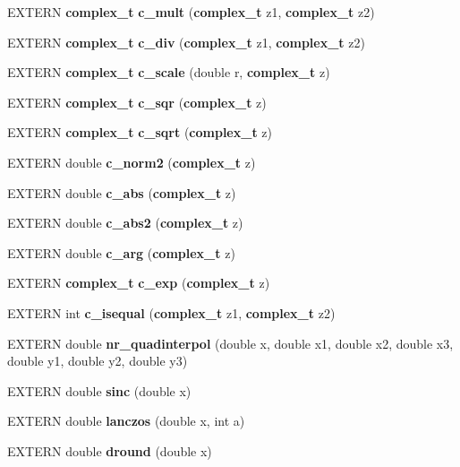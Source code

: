 \begin{CompactItemize}
\item 
EXTERN {\bf complex\_\-t} \textbf{c\_\-mult} ({\bf complex\_\-t} z1, {\bf complex\_\-t} z2)\label{group__nr_gbac492f503bff737e6a11c03e44e7ada}

\item 
EXTERN {\bf complex\_\-t} \textbf{c\_\-div} ({\bf complex\_\-t} z1, {\bf complex\_\-t} z2)\label{group__nr_g3cb3d7ddec167a30a5f7a159dea26c0f}

\item 
EXTERN {\bf complex\_\-t} \textbf{c\_\-scale} (double r, {\bf complex\_\-t} z)\label{group__nr_g4a8c814a8cb7b92c919b23e1ea64d615}

\item 
EXTERN {\bf complex\_\-t} \textbf{c\_\-sqr} ({\bf complex\_\-t} z)\label{group__nr_g72516630e1d745f5d1630b4c525cb5f8}

\item 
EXTERN {\bf complex\_\-t} \textbf{c\_\-sqrt} ({\bf complex\_\-t} z)\label{group__nr_g22d2bd8775120d34e3b700682e67d955}

\item 
EXTERN double \textbf{c\_\-norm2} ({\bf complex\_\-t} z)\label{group__nr_g98f394b1ddccfeb4d9b5edb6c1f8c652}

\item 
EXTERN double \textbf{c\_\-abs} ({\bf complex\_\-t} z)\label{group__nr_gdd54790aa13824ee1db3d0558a465071}

\item 
EXTERN double \textbf{c\_\-abs2} ({\bf complex\_\-t} z)\label{group__nr_g5a31b290dd721358e4270d9686347dde}

\item 
EXTERN double \textbf{c\_\-arg} ({\bf complex\_\-t} z)\label{group__nr_g5a8776cef7d6ef88a11015d6ec2665ba}

\item 
EXTERN {\bf complex\_\-t} \textbf{c\_\-exp} ({\bf complex\_\-t} z)\label{group__nr_g41a40da9e1d42de8e76d999abd476f8a}

\item 
EXTERN int \textbf{c\_\-isequal} ({\bf complex\_\-t} z1, {\bf complex\_\-t} z2)\label{group__nr_gd3e4d63450915ff27b8e506acb21bb2e}

\item 
EXTERN double {\bf nr\_\-quadinterpol} (double x, double x1, double x2, double x3, double y1, double y2, double y3)
\item 
EXTERN double {\bf sinc} (double x)
\item 
EXTERN double {\bf lanczos} (double x, int a)
\item 
EXTERN double {\bf dround} (double x)
\end{CompactItemize}
